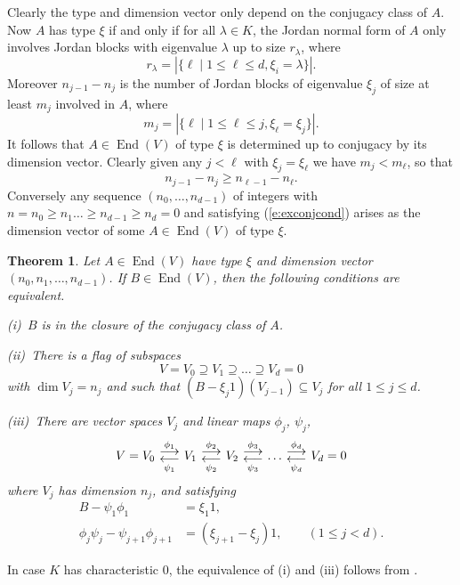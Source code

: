 \documentclass{amsart}
\theoremstyle{plain}
\newtheorem{thm}{Theorem}[section]
\theoremstyle{definition}
\theoremstyle{remark}
\DeclareMathOperator{\End}{End}
\DeclareMathOperator*{\rightoverleft}{\parbox{2em}{\centerline{$\longrightarrow$}\vskip -6pt\centerline{$\longleftarrow$}}}
\begin{document}
Clearly the type and dimension vector only depend on the conjugacy class of $A$.
Now $A$ has type $\xi$ if and only if for all $\lambda\in K$, the Jordan normal form of
$A$ only involves Jordan blocks with eigenvalue $\lambda$ up to size $r_\lambda$, where
\[
r_\lambda = |\{ \ell \mid 1\le \ell\le d, \xi_i = \lambda\}|.
\]
Moreover $n_{j-1} - n_j$ is the number of Jordan blocks of eigenvalue $\xi_j$ of size at
least $m_j$ involved in $A$, where
\[
m_j = |\{ \ell \mid 1\le \ell\le j, \xi_\ell = \xi_j \}|.
\]
It follows that $A\in\End(V)$ of type $\xi$ is determined up to conjugacy by
its dimension vector. Clearly given any $j<\ell$ with $\xi_j = \xi_\ell$
we have $m_j < m_\ell$, so that
%
\begin{equation}
\label{e:exconjcond}
n_{j-1}-n_{j} \ge n_{\ell-1}-n_{\ell}.
\end{equation}
%
Conversely any
sequence $(n_0,\dots,n_{d-1})$ of integers with $n=n_0\ge n_1\dots \ge n_{d-1} \ge n_d = 0$
and satisfying (\ref{e:exconjcond}) arises as the
dimension vector of some $A\in\End(V)$ of type $\xi$.


\begin{thm}
\label{t:conjclotriple}
Let $A\in\End(V)$ have type $\xi$ and dimension vector $(n_0,n_1,\dots,n_{d-1})$.
If $B\in\End(V)$, then the following conditions are equivalent.

\textup{\hphantom{ii}(i)}~$B$ is in the closure of the conjugacy class of $A$.

\textup{\hphantom{i}(ii)}~There is a flag of subspaces
\[
V = V_0 \supseteq V_1 \supseteq \dots \supseteq V_d = 0
\]
with $\dim V_j = n_j$ and such that $(B-\xi_j 1)(V_{j-1}) \subseteq V_j$ for all $1\le j\le d$.

\textup{(iii)}~There are vector spaces $V_j$ and linear maps $\phi_j$, $\psi_j$,
\[
V=V_0 \rightoverleft^{\phi_{1}}_{\psi_{1}} V_{1} \rightoverleft^{\phi_{2}}_{\psi_{2}} V_{2}
\rightoverleft^{\phi_{3}}_{\psi_{3}} \dots
\rightoverleft^{\phi_{d}}_{\psi_{d}} V_{d}=0
\]
where $V_j$ has dimension $n_j$, and satisfying
\[
\begin{split}
B - \psi_{1} \phi_{1}
&= \xi_{1} 1,
\\
\phi_{j} \psi_{j} - \psi_{j+1}\phi_{j+1}
&= (\xi_{j+1}-\xi_{j}) 1,
\qquad (1\le j < d).
\end{split}
\]
\end{thm}


In case $K$ has characteristic 0, the equivalence
of (i) and (iii) follows from \cite[Lemma 9.1]{CBnorm}.
\end{document}
